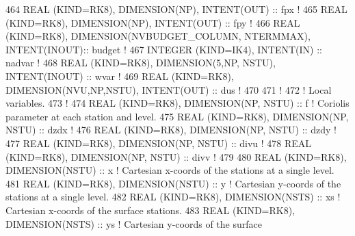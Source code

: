 \begin{DoxyCode}
464 \textcolor{keywordtype}{REAL (KIND=RK8)}, \textcolor{keywordtype}{DIMENSION(NP)}, \textcolor{keywordtype}{INTENT(OUT)}                         :: fpx      \textcolor{comment}{!}
465 \textcolor{keywordtype}{REAL (KIND=RK8)}, \textcolor{keywordtype}{DIMENSION(NP)}, \textcolor{keywordtype}{INTENT(OUT)}                         :: fpy      \textcolor{comment}{!}
466 \textcolor{keywordtype}{REAL (KIND=RK8)}, \textcolor{keywordtype}{DIMENSION(NVBUDGET\_COLUMN, NTERMMAX)}, \textcolor{keywordtype}{INTENT(INOUT)}:: budget   \textcolor{comment}{!}
467 \textcolor{keywordtype}{INTEGER (KIND=IK4)}, \textcolor{keywordtype}{INTENT(IN)}                                      :: nadvar   \textcolor{comment}{!}
468 \textcolor{keywordtype}{REAL (KIND=RK8)}, \textcolor{keywordtype}{DIMENSION(5,NP, NSTU)}, \textcolor{keywordtype}{INTENT(INOUT)}               :: wvar     \textcolor{comment}{!}
469 \textcolor{keywordtype}{REAL (KIND=RK8)}, \textcolor{keywordtype}{DIMENSION(NVU,NP,NSTU)}, \textcolor{keywordtype}{INTENT(OUT)}                :: dus      \textcolor{comment}{!}
470 
471 \textcolor{comment}{!}
472 \textcolor{comment}{! Local variables.}
473 \textcolor{comment}{!}
474 \textcolor{keywordtype}{REAL (KIND=RK8)}, \textcolor{keywordtype}{DIMENSION(NP, NSTU)}                :: f                \textcolor{comment}{! Coriolis parameter at each
       station and level.}
475 \textcolor{keywordtype}{REAL (KIND=RK8)}, \textcolor{keywordtype}{DIMENSION(NP, NSTU)}                :: dzdx             \textcolor{comment}{! }
476 \textcolor{keywordtype}{REAL (KIND=RK8)}, \textcolor{keywordtype}{DIMENSION(NP, NSTU)}                :: dzdy             \textcolor{comment}{!}
477 \textcolor{keywordtype}{REAL (KIND=RK8)}, \textcolor{keywordtype}{DIMENSION(NP, NSTU)}                :: divu             \textcolor{comment}{!}
478 \textcolor{keywordtype}{REAL (KIND=RK8)}, \textcolor{keywordtype}{DIMENSION(NP, NSTU)}                :: divv             \textcolor{comment}{!}
479 
480 \textcolor{keywordtype}{REAL (KIND=RK8)}, \textcolor{keywordtype}{DIMENSION(NSTU)}                    :: x                \textcolor{comment}{! Cartesian x-coords of the
       stations at a single level.}
481 \textcolor{keywordtype}{REAL (KIND=RK8)}, \textcolor{keywordtype}{DIMENSION(NSTU)}                    :: y                \textcolor{comment}{! Cartesian y-coords of the
       stations at a single level.}
482 \textcolor{keywordtype}{REAL (KIND=RK8)}, \textcolor{keywordtype}{DIMENSION(NSTS)}                    :: xs               \textcolor{comment}{! Cartesian x-coords of the surface
       stations.}
483 \textcolor{keywordtype}{REAL (KIND=RK8)}, \textcolor{keywordtype}{DIMENSION(NSTS)}                    :: ys               \textcolor{comment}{! Cartesian y-coords of the surface
}
\end{DoxyCode}
